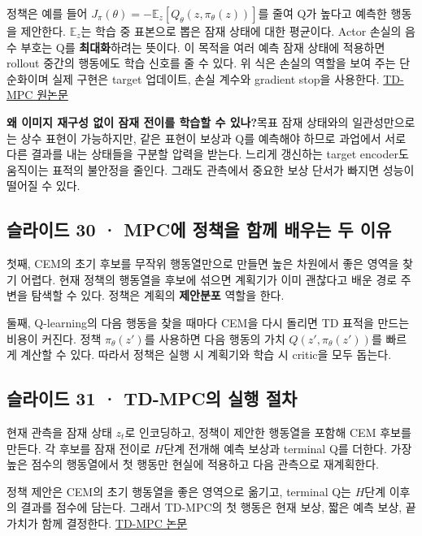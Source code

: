 \documentclass[11pt,a4paper]{article}
\begin{document}
정책은 예를 들어 $J_\pi(\theta)=-\mathbb E_{z}[Q_\theta(z,\pi_\theta(z))]$를 줄여 Q가 높다고 예측한 행동을 제안한다. $\mathbb E_z$는 학습 중 표본으로 뽑은 잠재 상태에 대한 평균이다. Actor 손실의 음수 부호는 Q를 \textbf{최대화}하려는 뜻이다. 이 목적을 여러 예측 잠재 상태에 적용하면 rollout 중간의 행동에도 학습 신호를 줄 수 있다. 위 식은 손실의 역할을 보여 주는 단순화이며 실제 구현은 target 업데이트, 손실 계수와 gradient stop을 사용한다. \href{https://proceedings.mlr.press/v162/hansen22a.html}{TD-MPC 원논문}\par

\par\medskip\noindent\textbf{왜 이미지 재구성 없이 잠재 전이를 학습할 수 있나?}\quad 목표 잠재 상태와의 일관성만으로는 상수 표현이 가능하지만, 같은 표현이 보상과 Q를 예측해야 하므로 과업에서 서로 다른 결과를 내는 상태들을 구분할 압력을 받는다. 느리게 갱신하는 target encoder도 움직이는 표적의 불안정을 줄인다. 그래도 관측에서 중요한 보상 단서가 빠지면 성능이 떨어질 수 있다.\par

\subsection{슬라이드 30 · MPC에 정책을 함께 배우는 두 이유}

첫째, CEM의 초기 후보를 무작위 행동열만으로 만들면 높은 차원에서 좋은 영역을 찾기 어렵다. 현재 정책의 행동열을 후보에 섞으면 계획기가 이미 괜찮다고 배운 경로 주변을 탐색할 수 있다. 정책은 계획의 \textbf{제안분포} 역할을 한다.\par

둘째, Q-learning의 다음 행동을 찾을 때마다 CEM을 다시 돌리면 TD 표적을 만드는 비용이 커진다. 정책 $\pi_\theta(z')$를 사용하면 다음 행동의 가치 $Q(z',\pi_\theta(z'))$를 빠르게 계산할 수 있다. 따라서 정책은 실행 시 계획기와 학습 시 critic을 모두 돕는다.\par

\subsection{슬라이드 31 · TD-MPC의 실행 절차}

현재 관측을 잠재 상태 $z_t$로 인코딩하고, 정책이 제안한 행동열을 포함해 CEM 후보를 만든다. 각 후보를 잠재 전이로 $H$단계 전개해 예측 보상과 terminal Q를 더한다. 가장 높은 점수의 행동열에서 첫 행동만 현실에 적용하고 다음 관측으로 재계획한다.\par

정책 제안은 CEM의 초기 행동열을 좋은 영역으로 옮기고, terminal Q는 $H$단계 이후의 결과를 점수에 담는다. 그래서 TD-MPC의 첫 행동은 현재 보상, 짧은 예측 보상, 끝 가치가 함께 결정한다. \href{https://proceedings.mlr.press/v162/hansen22a.html}{TD-MPC 논문}\par
\end{document}
